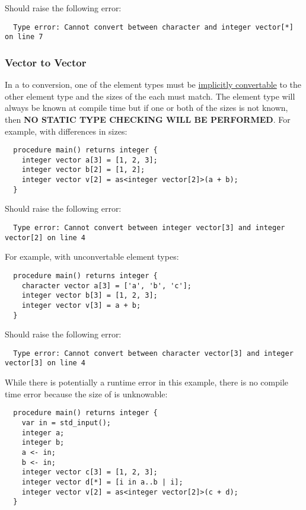 \documentclass[../gazprea.tex]{subfiles}
\begin{document}
Should raise the following error:
\begin{lstlisting}
  Type error: Cannot convert between character and integer vector[*] on line 7
\end{lstlisting}

\subsubsection{Vector to Vector}
\label{sssec:error_ops_vtov}
In a  to  conversion, one of the element types must be
\hyperref[sec:typePromotion]{implicitly convertable} to the other element type and the sizes of the
each  must match. The element type will always be known at compile time but if one or
both of the sizes is not known, then \textbf{NO STATIC TYPE CHECKING WILL BE PERFORMED}. For
example, with differences in sizes:
\begin{lstlisting}
  procedure main() returns integer {
    integer vector a[3] = [1, 2, 3];
    integer vector b[2] = [1, 2];
    integer vector v[2] = as<integer vector[2]>(a + b);
  }
\end{lstlisting}

Should raise the following error:
\begin{lstlisting}
  Type error: Cannot convert between integer vector[3] and integer vector[2] on line 4
\end{lstlisting}

For example, with unconvertable element types:
\begin{lstlisting}
  procedure main() returns integer {
    character vector a[3] = ['a', 'b', 'c'];
    integer vector b[3] = [1, 2, 3];
    integer vector v[3] = a + b;
  }
\end{lstlisting}

Should raise the following error:
\begin{lstlisting}
  Type error: Cannot convert between character vector[3] and integer vector[3] on line 4
\end{lstlisting}

While there is potentially a runtime error in this example, there is no compile time error because
the size of  is unknowable:
\begin{lstlisting}
  procedure main() returns integer {
    var in = std_input();
    integer a;
    integer b;
    a <- in;
    b <- in;
    integer vector c[3] = [1, 2, 3];
    integer vector d[*] = [i in a..b | i];
    integer vector v[2] = as<integer vector[2]>(c + d);
  }
\end{lstlisting}
\end{document}
